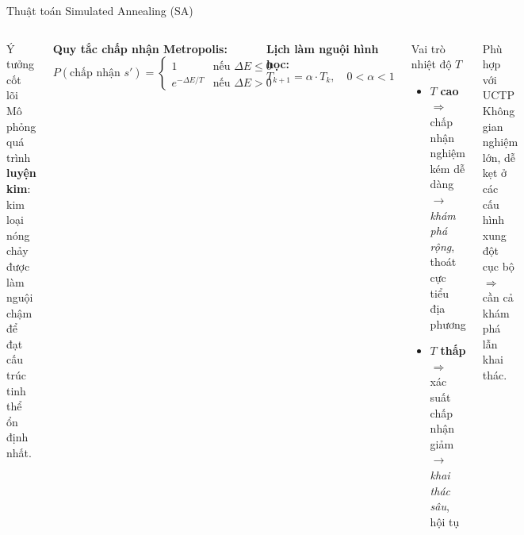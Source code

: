 \documentclass[aspectratio=169,10pt]{beamer}
\begin{document}
\begin{frame}{Thuật toán Simulated Annealing (SA)}
\begin{columns}[T]
\begin{block}{Ý tưởng cốt lõi}
Mô phỏng quá trình \textbf{luyện kim}: kim loại nóng chảy được làm nguội chậm để đạt cấu trúc tinh thể ổn định nhất.
\end{block}

\vspace{0.2cm}
\textbf{Quy tắc chấp nhận Metropolis:}
$$P(\text{chấp nhận } s') = \begin{cases} 1 & \text{nếu } \Delta E \leq 0 \\ e^{-\Delta E / T} & \text{nếu } \Delta E > 0 \end{cases}$$

\vspace{0.2cm}
\textbf{Lịch làm nguội hình học:}
$$T_{k+1} = \alpha \cdot T_k, \quad 0 < \alpha < 1$$

\begin{block}{Vai trò nhiệt độ $T$}
\begin{itemize}
  \item $T$ \textbf{cao} $\Rightarrow$ chấp nhận nghiệm kém dễ dàng\\
  $\rightarrow$ \textit{khám phá rộng}, thoát cực tiểu địa phương
  \item $T$ \textbf{thấp} $\Rightarrow$ xác suất chấp nhận giảm\\
  $\rightarrow$ \textit{khai thác sâu}, hội tụ
\end{itemize}
\end{block}

\vspace{0.2cm}
\begin{exampleblock}{Phù hợp với UCTP}
Không gian nghiệm lớn, dễ kẹt ở các cấu hình xung đột cục bộ $\Rightarrow$ cần cả khám phá lẫn khai thác.
\end{exampleblock}
\end{columns}
\end{frame}
\end{document}
